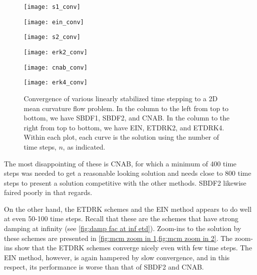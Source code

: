 \begin{figure}[htb!]
        \centering
\begin{minipage}{0.48\textwidth}
        \texttt{[image: s1\_conv]}
\end{minipage}
\begin{minipage}{0.48\textwidth}
        \texttt{[image: ein\_conv]}
\end{minipage}
\begin{minipage}{0.48\textwidth}
        \texttt{[image: s2\_conv]}
\end{minipage}
\begin{minipage}{0.48\textwidth}
        \texttt{[image: erk2\_conv]}
\end{minipage}
\begin{minipage}{0.48\textwidth}
        \texttt{[image: cnab\_conv]}
\end{minipage}
\begin{minipage}{0.48\textwidth}
        \texttt{[image: erk4\_conv]}
\end{minipage}
\caption[Convergence of linearly stabilized schemes to a shrinking dumbbell problem.]{Convergence of various linearly stabilized time stepping to a 2D mean curvature flow problem. In the column to the left from top to bottom, we have SBDF1, SBDF2, and CNAB. In the column to the right from top to bottom, we have EIN, ETDRK2, and ETDRK4. Within each plot, each curve is the solution using the number of time steps, $n$, as indicated.}
\label{fig:mcm 2d conv}
\end{figure}

The most disappointing of these is CNAB, for which a minimum of 400 time steps was needed to get a reasonable looking solution and needs close to 800 time steps to present a solution competitive with the other methods. SBDF2 likewise faired poorly in that regards. 

On the other hand, the ETDRK schemes and the EIN method appears to do well at even 50-100 time steps. Recall that these are the schemes that have strong damping at infinity (see \cref{fig:damp fac at inf etd}). Zoom-ins to the solution by these schemes are presented in \cref{fig:mcm zoom in 1,fig:mcm zoom in 2}. The zoom-ins show that the ETDRK schemes converge nicely even with few time steps. The EIN method, however, is again hampered by slow convergence, and in this respect, its performance is worse than that of SBDF2 and CNAB. 

